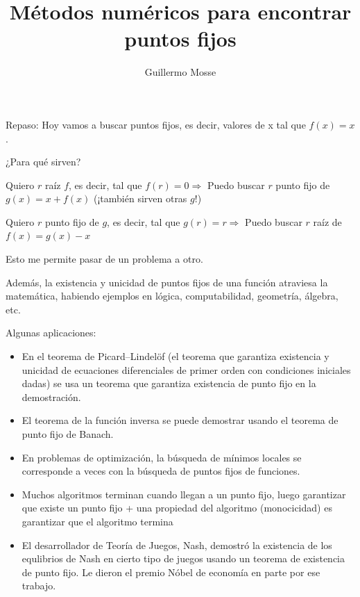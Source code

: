 \documentclass{article}
\title{Métodos numéricos para encontrar puntos fijos}
\author{Guillermo Mosse}
\begin{document}
\maketitle

Repaso: Hoy vamos a buscar puntos fijos, es decir, valores de x tal que $f(x)=x$.

¿Para qué sirven? 

Quiero $r$ raíz $f$, es decir, tal que $f(r)=0 \Rightarrow$ Puedo buscar $r$ punto fijo de $g(x) = x + f(x)$ (¡también sirven otras $g$!)

Quiero $r$ punto fijo de $g$, es decir, tal que $g(r)=r \Rightarrow$ Puedo buscar $r$ raíz de $f(x) = g(x) - x$

Esto me permite pasar de un problema a otro.

Además, la existencia y unicidad de puntos fijos de una función atraviesa la matemática, habiendo ejemplos en lógica, computabilidad, geometría, álgebra, etc. 

Algunas aplicaciones:

\begin{itemize}
    \item En el teorema de Picard–Lindelöf (el teorema que garantiza existencia y unicidad de ecuaciones diferenciales de primer orden con condiciones iniciales dadas) se usa un teorema que garantiza existencia de punto fijo en la demostración.
    \item El teorema de la función inversa se puede demostrar usando el teorema de punto fijo de Banach.
    \item En problemas de optimización, la búsqueda de mínimos locales se corresponde a veces con la búsqueda de puntos fijos de funciones.
    \item Muchos algoritmos terminan cuando llegan a un punto fijo, luego garantizar que existe un punto fijo + una propiedad del algoritmo (monocicidad) es garantizar que el algoritmo termina
    \item El desarrollador de Teoría de Juegos, Nash, demostró la existencia de los equlibrios de Nash en cierto tipo de juegos usando un teorema de existencia de punto fijo. Le dieron el premio Nóbel de economía en parte por ese trabajo.
\end{itemize}
\end{document}
